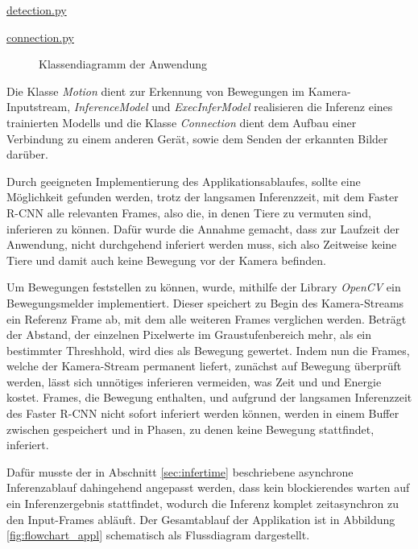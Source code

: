 \begin{minipage}{0.75\textwidth}
    \centering
    \underline{detection.py}
\end{minipage}
\begin{minipage}{0.25\textwidth}
    \centering
    \underline{connection.py}
\end{minipage}
\begin{figure}[H]
    \centering
        
    \caption{Klassendiagramm der Anwendung}
    \label{fig:class_diagram}
\end{figure}
\vspace{1cm}


Die Klasse \textit{Motion} dient zur Erkennung von Bewegungen 
im Kamera-Inputstream, \textit{InferenceModel} und
\textit{ExecInferModel} realisieren die Inferenz 
eines trainierten Modells und die Klasse 
\textit{Connection} dient dem Aufbau einer
Verbindung zu einem anderen Gerät, sowie dem Senden
der erkannten Bilder darüber.


Durch geeigneten Implementierung des Applikationsablaufes,
sollte eine Möglichkeit gefunden werden, trotz 
der langsamen Inferenzzeit, mit dem Faster R-CNN
alle relevanten Frames, also die, in denen Tiere zu vermuten
sind, inferieren zu können.
Dafür wurde die Annahme gemacht, dass zur Laufzeit der 
Anwendung, nicht durchgehend inferiert werden muss,
sich also Zeitweise keine Tiere und damit auch keine 
Bewegung vor der Kamera befinden.

Um Bewegungen feststellen zu können, 
wurde, mithilfe der Library \textit{OpenCV}
ein Bewegungsmelder implementiert.
Dieser speichert zu Begin des Kamera-Streams ein Referenz
Frame ab, mit dem alle weiteren Frames verglichen werden.
Beträgt der Abstand, der einzelnen Pixelwerte im 
Graustufenbereich mehr, als ein bestimmter 
Threshhold, wird dies als Bewegung gewertet.
Indem nun die Frames, welche der Kamera-Stream permanent 
liefert, zunächst auf Bewegung überprüft werden, 
lässt sich unnötiges inferieren vermeiden,
was Zeit und und Energie kostet.
Frames, die Bewegung enthalten, und aufgrund der langsamen 
Inferenzzeit des Faster R-CNN nicht sofort inferiert 
werden können, werden in einem Buffer zwischen 
gespeichert und in Phasen, zu denen keine Bewegung stattfindet, 
inferiert.

Dafür musste der in Abschnitt \ref{sec:infertime} beschriebene
asynchrone Inferenzablauf dahingehend angepasst werden,
dass kein blockierendes warten auf 
ein Inferenzergebnis stattfindet,
wodurch die Inferenz komplet zeitasynchron zu 
den Input-Frames abläuft.
Der Gesamtablauf der Applikation ist in Abbildung 
\ref{fig:flowchart_appl} 
schematisch als Flussdiagram dargestellt.

